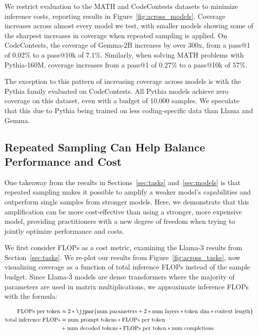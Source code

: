 \documentclass[11pt]{article}
\begin{document}
We restrict evaluation to the MATH and CodeContests datasets to minimize inference costs, reporting results in Figure~\ref{fig:across_models}. Coverage increases across almost every model we test, with smaller models showing some of the sharpest increases in coverage when repeated sampling is applied. On CodeContests, the coverage of Gemma-2B increases by over 300x, from a pass@1 of 0.02\% to a pass@10k of 7.1\%. 
Similarly, when solving MATH problems with Pythia-160M, coverage increases from a pass@1 of 0.27\% to a pass@10k of 57\%.

The exception to this pattern of increasing coverage across models is with the Pythia family evaluated on CodeContests. All Pythia models achieve zero coverage on this dataset, even with a budget of 10,000 samples. We speculate that this due to Pythia being trained on less coding-specific data than Llama and Gemma. 

\subsection{Repeated Sampling Can Help Balance Performance and Cost}
\label{sec:tradeoffs}

One takeaway from the results in Sections~\ref{sec:tasks} and~\ref{sec:models} is that repeated sampling makes it possible to amplify a weaker model's capabilities and outperform single samples from stronger models. 
Here, we demonstrate that this amplification can be more cost-effective than using a stronger, more expensive model, providing practitioners with a new degree of freedom when trying to jointly optimize performance and costs.

We first consider FLOPs as a cost metric, examining the Llama-3 results from Section~\ref{sec:tasks}. We re-plot our results from Figure~\ref{fig:across_tasks}, now visualizing coverage as a function of total inference FLOPs instead of the sample budget. Since Llama-3 models are dense transformers where the majority of parameters are used in matrix multiplications, we approximate inference FLOPs with the formula:

\begin{align*}
    \text{FLOPs per token} &\approx 2 * \jjpar{ \text{num parameters} + 2 * \text{num layers} * \text{token dim} * \text{context length}}\\
    \text{total inference FLOPs} &\approx \text{num prompt tokens} * \text{FLOPs per token}\\ &+ \text{num decoded tokens} * \text{FLOPs per token} * \text{num completions}
\end{align*}
\end{document}
